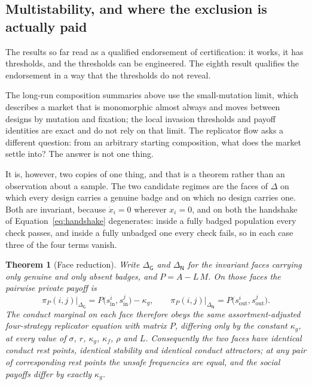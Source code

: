 \documentclass[11pt,a4paper]{article}
\newtheorem{theorem}{Theorem}
\theoremstyle{definition}
\newcommand{\piP}{\pi_{P}}
\begin{document}
\subsection{Multistability, and where the exclusion is actually paid}
\label{sec:exclusion}

The results so far read as a qualified endorsement of certification: it works,
it has thresholds, and the thresholds can be engineered. The eighth result
qualifies the endorsement in a way that the thresholds do not reveal.

The long-run composition summaries above use the small-mutation limit, which
describes a market that is monomorphic almost always and moves between designs
by mutation and fixation; the local invasion thresholds and payoff identities
are exact and do not rely on that limit. The replicator flow asks a different
question: from an arbitrary
starting composition, what does the market settle into? The answer is not one
thing.

It is, however, two copies of one thing, and that is a theorem rather than an
observation about a sample. The two candidate regimes are the faces of $\Delta$
on which every design carries a genuine badge and on which no design carries
one. Both are invariant, because $\dot{x}_i = 0$ wherever $x_i = 0$, and on
both the handshake of Equation~\eqref{eq:handshake} degenerates: inside a fully
badged population every check passes, and inside a fully unbadged one every
check fails, so in each case three of the four terms vanish.

\begin{theorem}[Face reduction]
\label{thm:face}
Write $\Delta_{\mathsf{G}}$ and $\Delta_{\mathsf{N}}$ for the invariant faces
carrying only genuine and only absent badges, and $P = A - L\,M$. On those
faces the pairwise private payoff is
\begin{equation}
\label{eq:facereduction}
\piP(i,j)\big|_{\Delta_{\mathsf{G}}}
  = P\big(s^{i}_{\mathrm{in}}, s^{j}_{\mathrm{in}}\big) - \kappa_g,
\qquad
\piP(i,j)\big|_{\Delta_{\mathsf{N}}}
  = P\big(s^{i}_{\mathrm{out}}, s^{j}_{\mathrm{out}}\big).
\end{equation}
The conduct marginal on each face therefore obeys the \emph{same}
assortment-adjusted four-strategy replicator equation with matrix $P$,
differing only by the constant $\kappa_g$, at every value of $\sigma$, $r$,
$\kappa_g$, $\kappa_f$, $\rho$ and $L$. Consequently the two faces have
identical conduct rest points, identical stability and identical conduct
attractors; at any pair of corresponding rest points the unsafe frequencies are
equal, and the social payoffs differ by exactly $\kappa_g$.
\end{theorem}
\end{document}
